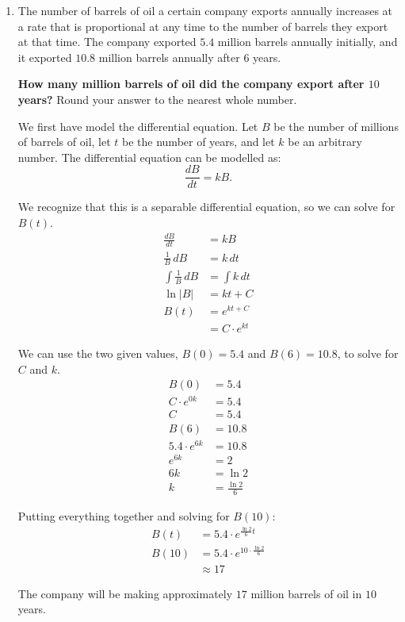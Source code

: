 \documentclass[12pt]{article}
\begin{document}
\begin{enumerate}
	\item The number of barrels of oil a certain company exports annually increases at a rate that is proportional at any time to the number of barrels they export at that time. The company exported $5.4$ million barrels annually initially, and it exported $10.8$ million barrels annually after $6$ years.

	      \noindent \textbf{How many million barrels of oil did the company export after $10$ years?} Round your answer to the nearest whole number.

	      \vspace{6mm}

	      We first have model the differential equation. Let $B$ be the number of millions of barrels of oil, let $t$ be the number of years, and let $k$ be an arbitrary number. The differential equation can be modelled as:
	      \[ \frac{dB}{dt} = kB. \]

	      We recognize that this is a separable differential equation, so we can solve for $B(t)$.
	      \begin{align*}
		      \frac{dB}{dt}          & = kB             \\[6pt]
		      \frac{1}{B} \, dB      & = k \, dt        \\[6pt]
		      \int \frac{1}{B} \, dB & = \int k \, dt   \\[6pt]
		      \ln|B|                 & = kt + C         \\
		      B(t)                   & = e^{kt + C}     \\
		      & = C \cdot e^{kt}
	      \end{align*}

	      We can use the two given values, $B(0) = 5.4$ and $B(6) = 10.8$, to solve for $C$ and $k$.
	      \begin{align*}
		      B(0)             & = 5.4             \\
		      C \cdot e^{0k}   & = 5.4             \\
		      C                & = 5.4             \\[10pt]
		      B(6)             & = 10.8            \\
		      5.4 \cdot e^{6k} & = 10.8            \\
		      e^{6k}           & = 2               \\
		      6k               & = \ln 2           \\
		      k                & = \frac{\ln 2}{6}
	      \end{align*}

	      Putting everything together and solving for $B(10)$:
	      \begin{align*}
		      B(t)  & = 5.4 \cdot e^{\frac{\ln 2}{6} t}        \\
		      B(10) & = 5.4 \cdot e^{10 \cdot \frac{\ln 2}{6}} \\
		      & \approx 17
	      \end{align*}

	      The company will be making approximately $17$ million barrels of oil in $10$ years.
\end{enumerate}
\end{document}
